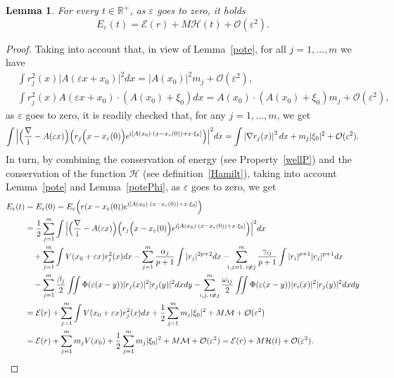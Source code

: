 \documentclass[11pt]{amsart}
\numberwithin{equation}{section}
\newtheorem{lemma}[theorem]{Lemma}
\theoremstyle{definition}
\begin{document}
\begin{lemma}
    \label{estUNO}
For every $t\in{{\mathbb R}}^+$, as ${\varepsilon}$ goes to zero, it holds
$$
E_{\varepsilon}(t)={\mathcal E}(r)+M{\mathcal H}(t)+{\mathcal O}({\varepsilon}^2).
$$
\end{lemma}
\begin{proof}
Taking into account that, in view of Lemma~\ref{pote}, for all
$j=1,\dots, m$ we have
\begin{align*}
& \int r^2_j(x)|A({\varepsilon} x+x_0)|^2dx=|A(x_0)|^2m_j+{\mathcal O}({\varepsilon}^2),   \\
& \int r^2_j(x)A({\varepsilon} x+x_0)\cdot (A(x_0)+\xi_0)dx=A(x_0)\cdot
(A(x_0)+\xi_0)m_j+{\mathcal O}({\varepsilon}^2),
\end{align*}
as ${\varepsilon}$ goes to zero, it is readily checked that, for any
$j=1,\dots,m$, we get
\begin{equation*}
 \int\Big|\Big(\frac{\nabla}{{\rm i}}-A({\varepsilon} x)\Big)
\Big(r_j\Big(x-x_{\varepsilon}(0)\Big)e^{{{\rm i}}[A(x_0)\cdot(x-x_{\varepsilon}(0))+x\cdot\xi_0]}\Big)\Big|^2dx
=\int\left|\nabla r_j(x)\right|^2dx +m_j|\xi_0|^2+{\mathcal
O}({\varepsilon}^2).
\end{equation*}
In turn, by combining the conservation of energy (see
Property~\ref{wellP}) and the conservation of the function
${\mathcal H}$ (see definition~\eqref{Hamilt}), taking into account
Lemma~\ref{pote} and Lemma~\ref{potePhi}, as ${\varepsilon}$ goes to zero, we get
$$\begin{aligned}
E_{\varepsilon}(t)&=E_{\varepsilon}(0)
=E_{\varepsilon}\Big(r(x-x_{\varepsilon}(0))e^{{{\rm i}}[A(x_0)\cdot(x-x_{\varepsilon}(0))
+x\cdot\xi_0]}\Big) \\
&=\frac{1}{2}\sum_{j=1}^m\int\Big|\Big(\frac{\nabla}{{\rm i}}-A({\varepsilon}
x)\Big)
\Big(r_j\Big(x-x_{\varepsilon}(0)\Big)e^{{{\rm i}}[A(x_0)\cdot(x-x_{\varepsilon}(0))+x\cdot\xi_0]}\Big)\Big|^2dx \\
& \quad +\sum_{j=1}^m\int  V(x_0+{\varepsilon} x)r^{2}_j(x)dx
-\sum_{j=1}^m\frac{\alpha_j}{p+1}\int |r_j|^{2p+2}dx
-\!\!\!\sum_{i,j=1,\,i\neq j}^m\frac{\gamma_{ij}}{p+1}\int |r_i|^{p+1}|r_j|^{p+1}dx \\
& \quad -\sum_{j=1}^m\frac{\beta_j}{2} \iint \Phi({\varepsilon}(x-y))|r_j(x)|^2|r_j(y)|^2
dx dy
 -\!\!\sum_{i,j,\,i\neq j}^m\frac{\omega_{ij}}{2} \iint \Phi({\varepsilon}(x-y))|r_i(x)|^2|r_j(y)|^2 dx dy \\
&={\mathcal E}(r)+\sum_{j=1}^m \int  V(x_0+{\varepsilon} x)r^{2}_j(x)dx
+\frac{1}{2}\sum_{j=1}^m m_j|\xi_0|^2+M{\mathcal M}+{\mathcal O}({\varepsilon}^2) \\
& ={\mathcal E}(r)+\sum_{j=1}^m m_jV(x_0)+\frac{1}{2}\sum_{j=1}^m m_j|\xi_0|^2+M{\mathcal M}+{\mathcal O}({\varepsilon}^2)
 ={\mathcal E}(r)+M{\mathcal H}(t)+{\mathcal O}({\varepsilon}^2).
\end{aligned}$$
\end{proof}
\end{document}
